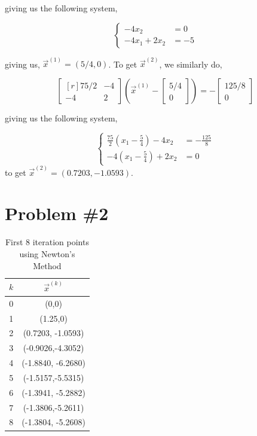 \documentclass{article}
\newcommand{\xk}[1]{\vec{x}^{(#1)}}
\begin{document}
giving us the following system,

\begin{equation*}
    \begin{cases}
    -4x_2 &= 0 \\
    -4 x_1 + 2x_2 &= -5
    \end{cases}
\end{equation*}

giving us, $\xk{1} = \left(5/4, 0\right)$. To get $\xk{2}$, we similarly do,

\begin{equation*}
    \begin{bmatrix*}[r]75/2& -4 \\ -4 & 2\end{bmatrix*}\left(\xk{1} - \begin{bmatrix*}
      5/4 \\ 0
    \end{bmatrix*}\right) = -\begin{bmatrix*}125/8 \\ 0\end{bmatrix*}
\end{equation*}

giving us the following system,

\begin{equation*}
    \begin{cases}
    \frac{75}{2}(x_1 - \frac{5}{4}) - 4x_2 &= -\frac{125}{8} \\
    -4 (x_1 - \frac{5}{4}) + 2x_2 &= 0
    \end{cases}
\end{equation*}
to get $\xk{2} = (0.7203, -1.0593)$.

\section*{Problem \#2}
\begin{table}[H]
    \centering
    \begin{tabular}{c|c}
         $k$& $\xk{k}$  \\
      \hline{} 0  & (0,0) \\
      1 & (1.25,0) \\
      2 & (0.7203, -1.0593) \\
      3 & (-0.9026,-4.3052) \\
      4 & (-1.8840, -6.2680) \\
      5 & (-1.5157,-5.5315)\\
      6 & (-1.3941, -5.2882)\\ 
      7 &  (-1.3806,-5.2611)\\
      8 & (-1.3804, -5.2608)
    \end{tabular}
    \caption{First 8 iteration points using Newton's Method}
    \label{tab:my_label}
\end{table}
\end{document}
